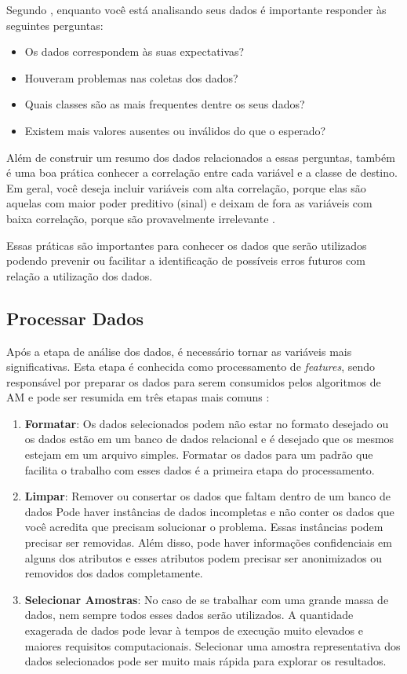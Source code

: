 Segundo , enquanto você está analisando seus dados é importante responder às seguintes perguntas:
\begin{itemize}
	\item Os dados correspondem às suas expectativas?
	\item Houveram problemas nas coletas dos dados?
	\item Quais classes são as mais frequentes dentre os seus dados?
	\item Existem mais valores ausentes ou inválidos do que o esperado?
\end{itemize}

Além de construir um resumo dos dados relacionados a essas perguntas, também é uma boa prática conhecer a correlação entre cada variável e a classe de destino. Em geral, você deseja incluir variáveis com alta correlação, porque elas são aquelas com maior poder preditivo (sinal) e deixam de fora as variáveis com baixa correlação, porque são provavelmente irrelevante \cite{Amazon}.

Essas práticas são importantes para conhecer os dados que serão utilizados podendo prevenir ou facilitar a identificação de possíveis erros futuros com relação a utilização dos dados.

\subsection{Processar Dados}

Após a etapa de análise dos dados, é necessário tornar as variáveis mais significativas. Esta etapa é conhecida como processamento de \textit{features}, sendo responsável por preparar os dados para serem consumidos pelos algoritmos de AM e pode ser resumida em três etapas mais comuns \cite{blum1997selection}:

\begin{enumerate}
	\item \textbf{Formatar}: Os dados selecionados podem não estar no formato desejado ou os dados estão em um banco de dados relacional e é desejado que os mesmos estejam em um arquivo simples. Formatar os dados para um padrão que facilita o trabalho com esses dados é a primeira etapa do processamento.
	\item \textbf{Limpar}: Remover ou consertar os dados que faltam dentro de um banco de dados  Pode haver instâncias de dados incompletas e não conter os dados que você acredita que precisam solucionar o problema. Essas instâncias podem precisar ser removidas. Além disso, pode haver informações confidenciais em alguns dos atributos e esses atributos podem precisar ser anonimizados ou removidos dos dados completamente.
	\item \textbf{Selecionar Amostras}: No caso de se trabalhar com uma grande massa de dados, nem sempre todos esses dados serão utilizados. A quantidade exagerada de dados pode levar à tempos de execução muito elevados e maiores requisitos computacionais. Selecionar uma amostra representativa dos dados selecionados pode ser muito mais rápida para explorar os resultados.
\end{enumerate}

